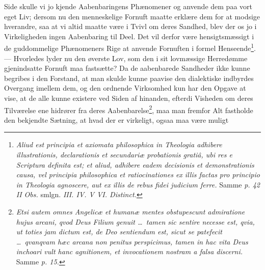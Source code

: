 \documentclass[12pt]{book}
\newcommand{\opage}[1]{\marginnote{\footnotesize\textit{[#1]}}}
\begin{document}
\opage{78} \setcounter{footnote}{0}%
Side skulle vi jo kjende Aabenbaringens Phænomener og anvende dem paa vort
eget Liv; dersom nu den menneskelige Fornuft maatte erklære dem for at
modsige hverandre, saa at vi altid maatte være i Tvivl om deres Sandhed, blev
der os jo i Virkeligheden ingen Aabenbaring til Deel. Det vil derfor være
hensigtsmæssigt i de guddommelige Phænomeners Rige at anvende Fornuften i
formel Henseende\footnote{\textit{Aliud est principia et axiomata philosophica
in Theologia adhibere illustrationis, declarationis et secundariæ probationis
gratiâ, ubi res e Scriptura definita est; et aliud, adhibere eadem decisionis
et demonstrationis causa, vel principia philosophica et ratiocinationes ex
illis factas pro principio in Theologia agnoscere, aut ex illis de rebus
fidei judicium ferre.} Samme \textit{p. 42 II Obs.} smlgn. \textit{III. IV. V
VI. Distinct.}}. --- Hvorledes lyder nu den øverste Lov, som den i sit
lovmæssige Herredømme gjenindsatte Fornuft maa fastsætte? Da de aabenbarede
Sandheder ikke kunne begribes i den Forstand, at man skulde kunne paavise den
dialektiske indbyrdes Overgang imellem dem, og den ordnende Virksomhed kun
har den Opgave at vise, at de alle kunne existere ved Siden af hinanden,
efterdi Visheden om deres Tilværelse ene hidrører fra deres
Aabenbarelse\footnote{\textit{Etsi autem omnes Angelicæ et humanæ mentes
obstupescunt admiratione hujus arcani, qvod Deus Filium genuit \ldots\ tamen
sic sentire necesse est, qvia, ut toties jam dictum est, de Deo sentiendum
est, sicut se patefecit \ldots\ qvanqvam hæc arcana non penitus perspicimus,
tamen in hac vita Deus inchoari vult hanc agnitionem, et invocationem nostram
a falsa discerni.} Samme \textit{p. 15.}}, maa man fremfor Alt fastholde den
bekjendte Sætning, at hvad der er virkeligt, ogsaa maa være muligt
\end{document}
